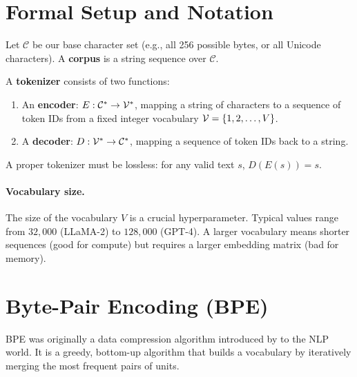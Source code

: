 \section{Formal Setup and Notation}
\label{ch:07:sec:setup}

Let $\mathcal{C}$ be our base character set (e.g., all 256 possible bytes, or all Unicode characters). A \textbf{corpus} is a string sequence over $\mathcal{C}$.

A \textbf{tokenizer} consists of two functions:
\begin{enumerate}
    \item An \textbf{encoder}: $E: \mathcal{C}^* \to \mathcal{V}^*$, mapping a string of characters to a sequence of token IDs from a fixed integer vocabulary $\mathcal{V} = \{1, 2, \dots, V\}$.
    \item A \textbf{decoder}: $D: \mathcal{V}^* \to \mathcal{C}^*$, mapping a sequence of token IDs back to a string.
\end{enumerate}

A proper tokenizer must be lossless: for any valid text $s$, $D(E(s)) = s$.

\paragraph{Vocabulary size.} The size of the vocabulary $V$ is a crucial hyperparameter. Typical values range from $32,000$ (LLaMA-2) to $128,000$ (GPT-4). A larger vocabulary means shorter sequences (good for compute) but requires a larger embedding matrix (bad for memory).

\section{Byte-Pair Encoding (BPE)}
\label{ch:07:sec:main}

BPE was originally a data compression algorithm introduced by \textcite{sennrich_2016} to the NLP world. It is a greedy, bottom-up algorithm that builds a vocabulary by iteratively merging the most frequent pairs of units.

